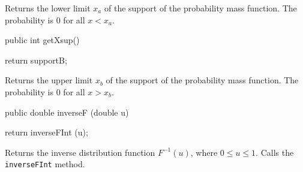 \begin{tabb} Returns the lower limit $x_a$ of the support of the probability
 mass function. The probability is 0 for all $x < x_a$.
\end{tabb}
\begin{htmlonly}
\end{htmlonly}
\begin{code}

   public int getXsup()\begin{hide} {
      return supportB;
   }\end{hide}
\end{code}
\begin{tabb} Returns the upper limit $x_b$ of the support of the  probability
 mass function. The probability is 0 for all $x > x_b$.
\end{tabb}
\begin{htmlonly}
\end{htmlonly}
\begin{code}

   public double inverseF (double u)\begin{hide} {
      return inverseFInt (u);
   }\end{hide}
\end{code}
\begin{tabb}  Returns the inverse distribution function
  $F^{-1}(u)$, where $0\le u\le 1$. Calls the \texttt{inverseFInt} method.
\end{tabb}
\begin{htmlonly}
\end{htmlonly}
